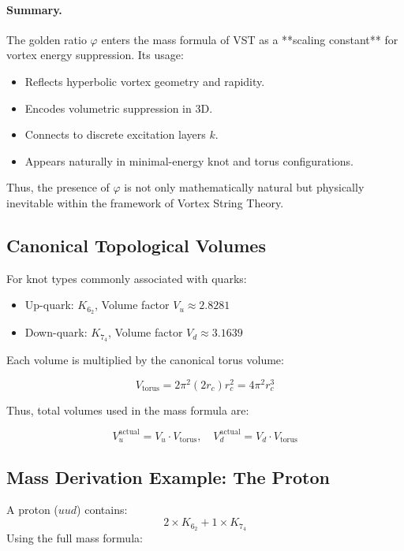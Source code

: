 \documentclass[11pt]{article}
\begin{document}
    \paragraph{Summary.}
    The golden ratio \( \varphi \) enters the mass formula of VST as a **scaling constant** for vortex energy suppression. Its usage:
    \begin{itemize}
        \item Reflects hyperbolic vortex geometry and rapidity.
        \item Encodes volumetric suppression in 3D.
        \item Connects to discrete excitation layers \( k \).
        \item Appears naturally in minimal-energy knot and torus configurations.
    \end{itemize}
    Thus, the presence of \( \varphi \) is not only mathematically natural but physically inevitable within the framework of Vortex String Theory.

    \subsection{Canonical Topological Volumes}

    For knot types commonly associated with quarks:

    \begin{itemize}
        \item Up-quark: \( K_{6_2} \), Volume factor \( V_u \approx 2.8281 \)
        \item Down-quark: \( K_{7_4} \), Volume factor \( V_d \approx 3.1639 \)
    \end{itemize}

    Each volume is multiplied by the canonical torus volume:

    \[
        V_{\text{torus}} = 2 \pi^2 (2r_c) r_c^2 = 4 \pi^2 r_c^3
    \]

    Thus, total volumes used in the mass formula are:

    \[
        V_u^{\text{actual}} = V_u \cdot V_{\text{torus}}, \quad
        V_d^{\text{actual}} = V_d \cdot V_{\text{torus}}
    \]

    \subsection{Mass Derivation Example: The Proton}

    A proton (\( uud \)) contains:
    \[
        2 \times K_{6_2} + 1 \times K_{7_4}
    \]
    Using the full mass formula:
\end{document}
